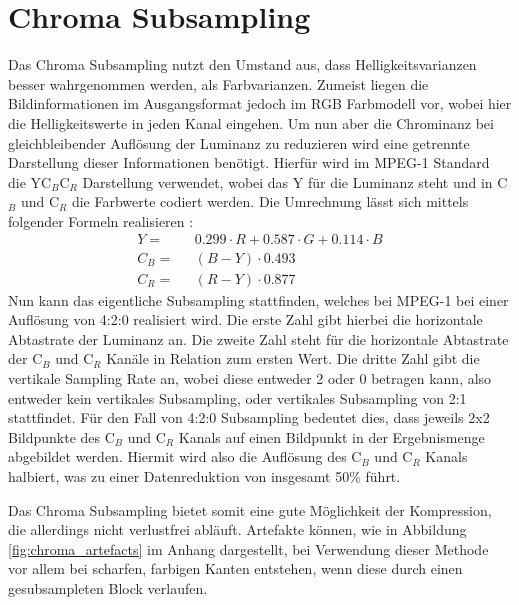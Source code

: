 \section{Chroma Subsampling}

Das Chroma Subsampling nutzt den Umstand aus, dass Helligkeitsvarianzen besser wahrgenommen werden, als Farbvarianzen. Zumeist liegen die Bildinformationen im Ausgangsformat jedoch im RGB Farbmodell vor, wobei hier die Helligkeitswerte in jeden Kanal eingehen. Um nun aber die Chrominanz bei gleichbleibender Auflösung der Luminanz zu reduzieren wird eine getrennte Darstellung dieser Informationen benötigt. Hierfür wird im MPEG-1 Standard die YC$_B$C$_R$ Darstellung verwendet, wobei das Y für die Luminanz steht und in C$_B$ und C$_R$ die Farbwerte codiert werden. Die Umrechnung lässt sich mittels folgender Formeln realisieren \cite{itu-t_recommendation_1995}:
\thickmuskip
\begin{align*}
	Y = & \text{ } 0.299 \cdot R + 0.587 \cdot G + 0.114 \cdot B \\
	C_B = & \text{ } (B - Y) \cdot 0.493 \\
	C_R = & \text{ } (R - Y) \cdot 0.877
\end{align*}
Nun kann das eigentliche Subsampling stattfinden, welches bei MPEG-1 bei einer Auflösung von 4:2:0 realisiert wird. Die erste Zahl gibt hierbei die horizontale Abtastrate der Luminanz an. Die zweite Zahl steht für die horizontale Abtastrate der C$_B$ und C$_R$ Kanäle in Relation zum ersten Wert. Die dritte Zahl gibt die vertikale Sampling Rate an, wobei diese entweder 2 oder 0 betragen kann, also entweder kein vertikales Subsampling, oder vertikales Subsampling von 2:1 stattfindet. Für den Fall von 4:2:0 Subsampling bedeutet dies, dass jeweils 2x2 Bildpunkte des C$_B$ und C$_R$ Kanals auf einen Bildpunkt in der Ergebnismenge abgebildet werden. Hiermit wird also die Auflösung des C$_B$ und C$_R$ Kanals halbiert, was zu einer Datenreduktion von insgesamt 50\% führt. \cite{poynton_chroma_????} %

Das Chroma Subsampling bietet somit eine gute Möglichkeit der Kompression, die allerdings nicht verlustfrei abläuft. Artefakte können, wie in Abbildung \ref{fig:chroma_artefacts} im Anhang dargestellt, bei Verwendung dieser Methode vor allem bei scharfen, farbigen Kanten entstehen, wenn diese durch einen gesubsampleten Block verlaufen.



